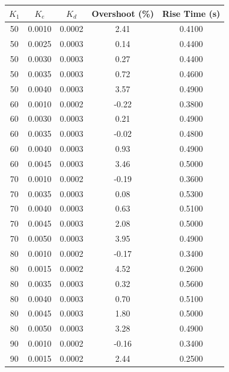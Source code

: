 \documentclass[12pt]{report}
\begin{document}
\begin{table}[H]
    \centering
    \begin{tabular}{|c|c|c|c|c|}
    \hline
    {$K_1$} & {$K_e$} & {$K_d$} & {Overshoot (\%)} & {Rise Time (s)} \\
    \hline
    50      & 0.0010  & 0.0002  &  2.41            & 0.4100 \\
    50      & 0.0025  & 0.0003  &  0.14            & 0.4400 \\
    50      & 0.0030  & 0.0003  &  0.27            & 0.4400 \\
    50      & 0.0035  & 0.0003  &  0.72            & 0.4600 \\
    50      & 0.0040  & 0.0003  &  3.57            & 0.4900 \\
    60      & 0.0010  & 0.0002  & -0.22            & 0.3800 \\
    60      & 0.0030  & 0.0003  &  0.21            & 0.4900 \\
    60      & 0.0035  & 0.0003  & -0.02            & 0.4800 \\
    60      & 0.0040  & 0.0003  &  0.93            & 0.4900 \\
    60      & 0.0045  & 0.0003  &  3.46            & 0.5000 \\
    70      & 0.0010  & 0.0002  & -0.19            & 0.3600 \\
    70      & 0.0035  & 0.0003  &  0.08            & 0.5300 \\
    70      & 0.0040  & 0.0003  &  0.63            & 0.5100 \\
    70      & 0.0045  & 0.0003  &  2.08            & 0.5000 \\
    70      & 0.0050  & 0.0003  &  3.95            & 0.4900 \\
    80      & 0.0010  & 0.0002  & -0.17            & 0.3400 \\
    80      & 0.0015  & 0.0002  &  4.52            & 0.2600 \\
    80      & 0.0035  & 0.0003  &  0.32            & 0.5600 \\
    80      & 0.0040  & 0.0003  &  0.70            & 0.5100 \\
    80      & 0.0045  & 0.0003  &  1.80            & 0.5000 \\
    80      & 0.0050  & 0.0003  &  3.28            & 0.4900 \\
    90      & 0.0010  & 0.0002  & -0.16            & 0.3400 \\
    90      & 0.0015  & 0.0002  &  2.44            & 0.2500 \\

\end{tabular}
\end{table}
\end{document}
